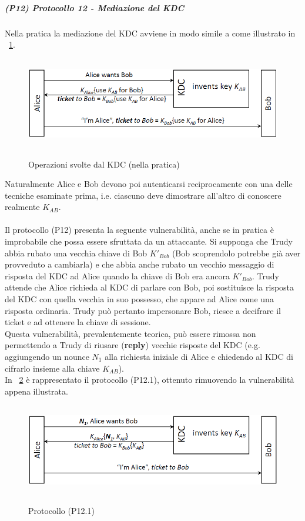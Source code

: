 \subparagraph{(P12) Protocollo 12 - Mediazione del KDC}
Nella pratica la mediazione del KDC avviene in modo simile a come illustrato in \figurename~\ref{fig:ImgS97bis}.
\begin{figure}[htbp]
	\centering%
	\subfigure%
	{\includegraphics[height=4cm, width=12cm, keepaspectratio]{Immagini/autenticazione/ImgS97bis.png}}
	\caption{Operazioni svolte dal KDC (nella pratica)}\label{fig:ImgS97bis} 	
\end{figure}
Naturalmente Alice e Bob devono poi autenticarsi reciprocamente con una delle tecniche esaminate prima, i.e. ciascuno deve dimostrare all'altro di conoscere realmente $K_{AB}$.\\ \\
Il protocollo (P12) presenta la seguente vulnerabilità, anche se in pratica è improbabile che possa essere sfruttata da un attaccante. Si supponga che Trudy abbia rubato una vecchia chiave di Bob $K'_{Bob}$ (Bob scoprendolo potrebbe già aver provveduto a cambiarla) e che abbia anche rubato un vecchio messaggio di risposta del KDC ad Alice quando la chiave di Bob era ancora $K'_{Bob}$. Trudy attende che Alice richieda al KDC di parlare con Bob, poi sostituisce la risposta del KDC con quella vecchia in suo possesso, che appare ad Alice come una risposta ordinaria. Trudy può pertanto impersonare Bob, riesce a decifrare il ticket e ad ottenere la chiave di sessione.\\
Questa vulnerabilità, prevalentemente teorica, può essere rimossa non permettendo a Trudy di riusare (\textbf{reply}) vecchie risposte del KDC (e.g. aggiungendo un nounce $N_{1}$ alla richiesta iniziale di Alice e chiedendo al KDC di cifrarlo insieme alla chiave $K_{AB}$).\\
In \figurename~\ref{fig:ImgS103bis} è rappresentato il protocollo (P12.1), ottenuto rimuovendo la vulnerabilità appena illustrata.
\begin{figure}[htbp]
	\centering%
	\subfigure%
	{\includegraphics[height=4cm, width=12cm, keepaspectratio]{Immagini/autenticazione/ImgS103bis.png}}
	\caption{Protocollo (P12.1)}\label{fig:ImgS103bis} 	
\end{figure}
